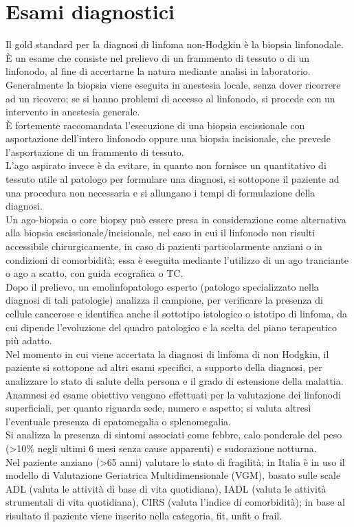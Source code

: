 \section{Esami diagnostici}
Il gold standard per la diagnosi di linfoma non-Hodgkin è la biopsia linfonodale. 
È un esame che consiste nel prelievo di un frammento di tessuto o di un linfonodo, al fine di 
accertarne la natura mediante analisi in laboratorio. 
Generalmente la biopsia viene eseguita in anestesia locale, senza dover ricorrere ad un ricovero; 
se si hanno problemi di accesso al linfonodo, si procede con un intervento in anestesia generale\cite{ISS}.\\
È fortemente raccomandata l’esecuzione di una biopsia escissionale con asportazione dell’intero linfonodo 
oppure una biopsia incisionale, che prevede l’asportazione di un frammento di tessuto\cite{AMERICANCANCER}.\\ 
L’ago aspirato invece è da evitare, in quanto non fornisce un quantitativo di tessuto utile al patologo per formulare 
una diagnosi, si sottopone il paziente ad una procedura non necessaria e si allungano i tempi di formulazione 
della diagnosi\cite{reteveneta}.\\
Un ago-biopsia o core biopsy può essere presa in considerazione come alternativa alla biopsia escissionale/incisionale,
nel caso in cui il linfonodo non risulti accessibile chirurgicamente, in caso di pazienti particolarmente anziani o in 
condizioni di comorbidità; essa è eseguita mediante l’utilizzo di un ago tranciante o ago a scatto, con guida 
ecografica o TC\cite{reteveneta}.\\
Dopo il prelievo, un emolinfopatologo esperto (patologo specializzato nella diagnosi di tali patologie) analizza 
il campione, per verificare la presenza di cellule cancerose e identifica anche il sottotipo 
istologico o istotipo di linfoma, da cui dipende l’evoluzione del quadro patologico e la scelta del piano 
terapeutico più adatto\cite{LLS}.\\

Nel momento in cui viene accertata la diagnosi di linfoma di non Hodgkin, il paziente si sottopone ad altri 
esami specifici, a supporto della diagnosi, per analizzare lo stato di salute della persona e il grado di 
estensione della malattia.\\
Anamnesi ed esame obiettivo vengono effettuati per la valutazione dei linfonodi superficiali, per quanto 
riguarda sede, numero e aspetto; si valuta altresì l'eventuale presenza di epatomegalia o splenomegalia.\\
Si analizza la presenza di sintomi associati come febbre, calo ponderale del peso 
(>10\% negli ultimi 6 mesi senza cause apparenti) e sudorazione notturna\cite{reteveneta}.\\
Nel paziente anziano (>65 anni) valutare lo stato di fragilità; in Italia è in uso il modello di 
Valutazione Geriatrica Multidimensionale (VGM), basato sulle scale ADL (valuta le attività di base di vita quotidiana),
IADL (valuta le attività strumentali di vita quotidiana), CIRS (valuta l’indice di comorbidità); 
in base al risultato il paziente viene inserito nella categoria, fit, unfit o frail\cite{AIOM}.

